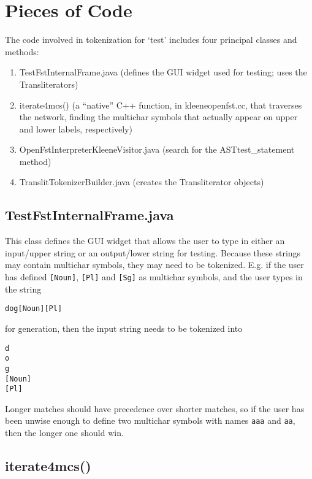 \documentclass[letterpaper,12pt]{article}
\begin{document}
\section{Pieces of Code}

The code involved in tokenization for `test' includes four principal
classes and methods:

\begin{enumerate}
\item
TestFstInternalFrame.java (defines the GUI widget used for testing; uses
the Transliterators)
\item
iterate4mcs()  (a ``native'' C++ function, in kleeneopenfst.cc, that traverses the network,
finding the multichar symbols that actually appear on upper and lower
labels, respectively)
\item
OpenFstInterpreterKleeneVisitor.java (search for the ASTtest\_statement method)
\item
TranslitTokenizerBuilder.java (creates the Transliterator objects)

\end{enumerate}

\subsection{TestFstInternalFrame.java}

This class defines the GUI widget that allows the user to type in either
an input/upper string or an output/lower string for testing.  Because
these strings may contain multichar symbols, they may need to be
tokenized.  E.g. if the user has defined \texttt{[Noun]}, \texttt{[Pl]}
and \texttt{[Sg]} as multichar symbols, and the user types in the string

\begin{Verbatim}[fontsize=\small]
dog[Noun][Pl]
\end{Verbatim}

\noindent
for generation, then the input string needs to be tokenized into 

\begin{Verbatim}[fontsize=\small]
d
o
g
[Noun]
[Pl]
\end{Verbatim}

\noindent
Longer matches should have precedence over shorter matches, so if the
user has been unwise enough to define two multichar symbols with names
\texttt{aaa} and \texttt{aa}, then the longer one should win.

\subsection{iterate4mcs()}
\end{document}
